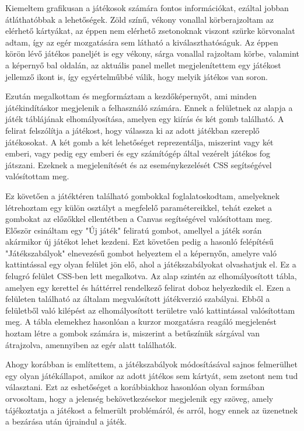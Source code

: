
Kiemeltem grafikusan a játékosok számára fontos információkat, ezáltal jobban átláthatóbbak a lehetőségek. Zöld színű, vékony vonallal körberajzoltam az elérhető kártyákat, az éppen nem elérhető zsetonoknak viszont szürke körvonalat adtam, így az egér mozgatására sem látható a kiválaszthatóságuk. Az éppen körön lévő játékos paneljét is egy vékony, sárga vonallal rajzoltam körbe, valamint a képernyő bal oldalán, az aktuális panel mellet megjelenítettem egy játékost jellemző ikont is, így egyértelműbbé válik, hogy melyik játékos van soron.


Ezután megalkottam és megformáztam a kezdőképernyőt, ami minden játékindításkor megjelenik a felhasználó számára. Ennek a felületnek az alapja a játék táblájának elhomályosítása, amelyen egy kiírás és két gomb található. A felirat felszólítja a játékost, hogy válassza ki az adott játékban szereplő játékosokat. A két gomb a két lehetőséget reprezentálja, miszerint vagy két emberi, vagy pedig egy emberi és egy számítógép által vezérelt játékos fog játszani. Ezeknek a megjelenítését és az eseménykezelését CSS segítségével valósítottam meg.



Ez követően a játéktéren található gombokkal foglalatoskodtam, amelyeknek létrehoztam egy külön osztályt a megfelelő paramétereikkel, tehát ezeket a gombokat az előzőkkel ellentétben a Canvas segítségével valósítottam meg. Először csináltam egy "Új játék" feliratú gombot, amellyel a játék során akármikor új játékot lehet kezdeni. Ezt követően pedig a hasonló felépítésű "Játékszabályok" elnevezésű gombot helyeztem el a képernyőn, amelyre való kattintással egy olyan felület jön elő, ahol a játékszabályokat olvashatjuk el. Ez a felugró felület CSS-ben lett megalkotva. Az alap szintén az elhomályosított tábla, amelyen egy kerettel és háttérrel rendelkező felirat doboz helyezkedik el. Ezen a felületen található az általam megvalósított játékverzió szabályai. Ebből a felületből való kilépést az elhomályosított területre való kattintással valósítottam meg. A tábla elemekhez hasonlóan a kurzor mozgatásra reagáló megjelenést hoztam létre a gombok számára is, miszerint a betűszínük sárgával van átrajzolva, amennyiben az egér alatt találhatók.



Ahogy korábban is említettem, a játékszabályok módosításával sajnos felmerülhet egy olyan játékállapot, amikor az adott játékos sem kártyát, sem zsetont nem tud választani. Ezt az eshetőséget a korábbiakhoz hasonlóan olyan formában orvosoltam, hogy a jelenség bekövetkezésekor megjelenik egy szöveg, amely tájékoztatja a játékost a felmerült problémáról, és arról, hogy ennek az üzenetnek a bezárása után újraindul a játék.

